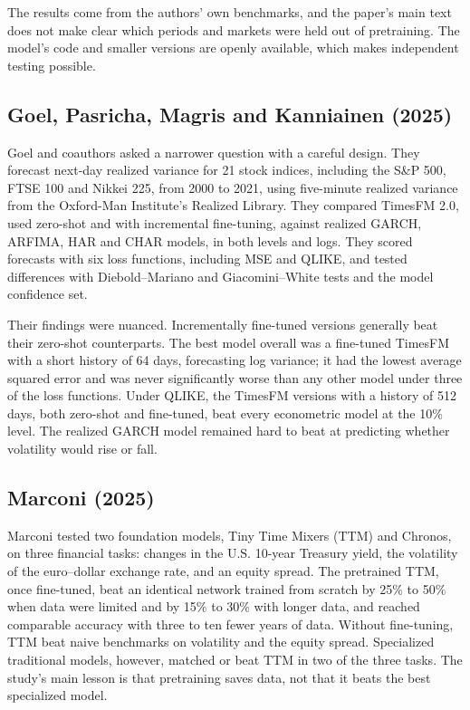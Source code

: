 The results come from the authors' own benchmarks, and the paper's main text does not make clear which periods and markets were held out of pretraining. The model's code and smaller versions are openly available, which makes independent testing possible.

\subsection{Goel, Pasricha, Magris and Kanniainen (2025)}

Goel and coauthors asked a narrower question with a careful design. They forecast next-day realized variance for 21 stock indices, including the S\&P 500, FTSE 100 and Nikkei 225, from 2000 to 2021, using five-minute realized variance from the Oxford-Man Institute's Realized Library. They compared TimesFM 2.0, used zero-shot and with incremental fine-tuning, against realized GARCH, ARFIMA, HAR and CHAR models, in both levels and logs. They scored forecasts with six loss functions, including MSE and QLIKE, and tested differences with Diebold--Mariano and Giacomini--White tests and the model confidence set.

Their findings were nuanced. Incrementally fine-tuned versions generally beat their zero-shot counterparts. The best model overall was a fine-tuned TimesFM with a short history of 64 days, forecasting log variance; it had the lowest average squared error and was never significantly worse than any other model under three of the loss functions. Under QLIKE, the TimesFM versions with a history of 512 days, both zero-shot and fine-tuned, beat every econometric model at the 10\% level. The realized GARCH model remained hard to beat at predicting whether volatility would rise or fall.

\subsection{Marconi (2025)}

Marconi tested two foundation models, Tiny Time Mixers (TTM) and Chronos, on three financial tasks: changes in the U.S. 10-year Treasury yield, the volatility of the euro--dollar exchange rate, and an equity spread. The pretrained TTM, once fine-tuned, beat an identical network trained from scratch by 25\% to 50\% when data were limited and by 15\% to 30\% with longer data, and reached comparable accuracy with three to ten fewer years of data. Without fine-tuning, TTM beat naive benchmarks on volatility and the equity spread. Specialized traditional models, however, matched or beat TTM in two of the three tasks. The study's main lesson is that pretraining saves data, not that it beats the best specialized model.

